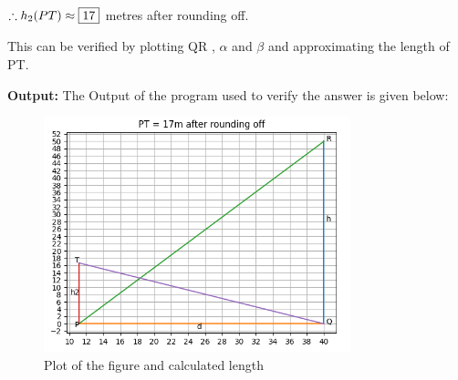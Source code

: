 \documentclass[journal,12pt,twocolumn]{IEEEtran}
\begin{document}
\begin{flushleft}
$\therefore h_2(PT)   \approx \fbox{17} $ metres after rounding off.


This can be verified by plotting QR , $\alpha$ and $\beta$ and approximating 
the length of PT.

\noindent\textbf{Output:}
The Output of the program used to verify the answer is given below:

\begin{figure}[h]
\includegraphics[width=252pt]{output.png}
\caption{Plot of the figure and calculated length}
\end{figure}

\end{flushleft}
\end{document}
